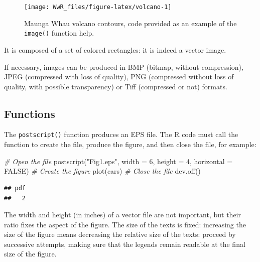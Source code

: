 \documentclass[
  12pt,
  american,
  a4paper,
  extrafontsizes,onecolumn,openright
  ]{memoir}
\newenvironment{Shaded}{\begin{snugshade}}{\end{snugshade}}
\newcommand{\AttributeTok}[1]{\textcolor[rgb]{0.77,0.63,0.00}{#1}}
\newcommand{\CommentTok}[1]{\textcolor[rgb]{0.56,0.35,0.01}{\textit{#1}}}
\newcommand{\ConstantTok}[1]{\textcolor[rgb]{0.00,0.00,0.00}{#1}}
\newcommand{\DecValTok}[1]{\textcolor[rgb]{0.00,0.00,0.81}{#1}}
\newcommand{\FunctionTok}[1]{\textcolor[rgb]{0.00,0.00,0.00}{#1}}
\newcommand{\NormalTok}[1]{#1}
\newcommand{\StringTok}[1]{\textcolor[rgb]{0.31,0.60,0.02}{#1}}
\begin{document}
\begin{figure}

{\centering \texttt{[image: WwR\_files/figure-latex/volcano-1]} 

}

\caption{Maunga Whau volcano contours, code provided as an example of the \texttt{image()} function help.}\label{fig:volcano}
\end{figure}

\normalsize

It is composed of a set of colored rectangles: it is indeed a vector image.

If necessary, images can be produced in BMP (bitmap, without compression), JPEG (compressed with loss of quality), PNG (compressed without loss of quality, with possible transparency) or Tiff (compressed or not) formats.

\hypertarget{functions}{%
\subsection{Functions}\label{functions}}

The \texttt{postscript()} function produces an EPS file.
The R code must call the function to create the file, produce the figure, and then close the file, for example:

\scriptsize

\begin{Shaded}
\begin{Highlighting}[]
\CommentTok{\# Open the file}
\FunctionTok{postscript}\NormalTok{(}\StringTok{"Fig1.eps"}\NormalTok{, }\AttributeTok{width =} \DecValTok{6}\NormalTok{, }\AttributeTok{height =} \DecValTok{4}\NormalTok{, }\AttributeTok{horizontal =} \ConstantTok{FALSE}\NormalTok{)}
\CommentTok{\# Create the figure}
\FunctionTok{plot}\NormalTok{(cars)}
\CommentTok{\# Close the file}
\FunctionTok{dev.off}\NormalTok{()}
\end{Highlighting}
\end{Shaded}

\begin{verbatim}
## pdf 
##   2
\end{verbatim}

\normalsize

The width and height (in inches) of a vector file are not important, but their ratio fixes the aspect of the figure.
The size of the texts is fixed: increasing the size of the figure means decreasing the relative size of the texts: proceed by successive attempts, making sure that the legends remain readable at the final size of the figure.
\end{document}
